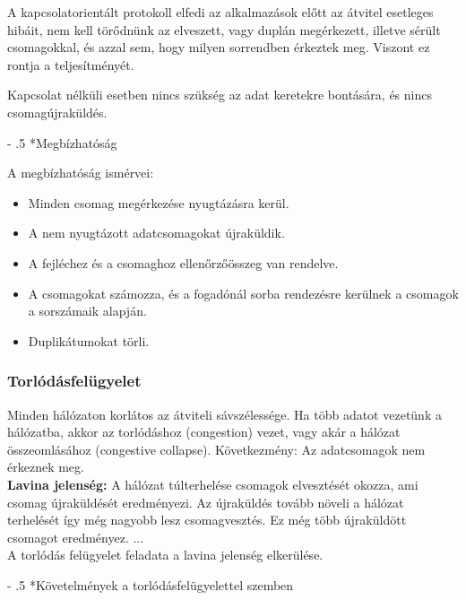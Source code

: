 \documentclass[12pt]{article}
\makeatletter
\renewcommand\paragraph{%
	\@startsection{paragraph}{4}{0mm}%
	{-\baselineskip}%
	{.5\baselineskip}%
	{\normalfont\normalsize\bfseries}}
\makeatother
\begin{document}
    \noindent A kapcsolatorientált protokoll elfedi az alkalmazások előtt az átvitel esetleges hibáit, nem kell törődnünk az elveszett, vagy duplán megérkezett, illetve sérült csomagokkal, és azzal sem, hogy milyen sorrendben érkeztek meg. Viszont ez rontja a teljesítményét.

	\noindent Kapcsolat nélküli esetben nincs szükség az adat keretekre bontására, és nincs  csomagújraküldés.

	\paragraph*{Megbízhatóság}

	A megbízhatóság ismérvei:
	\begin{itemize}
        	\item Minden csomag megérkezése nyugtázásra kerül.
        	\item A nem nyugtázott adatcsomagokat újraküldik.
        	\item A fejléchez és a csomaghoz ellenőrzőösszeg van rendelve.
        	\item A csomagokat számozza, és a fogadónál sorba rendezésre kerülnek a csomagok a sorszámaik alapján.
        	\item Duplikátumokat törli.
	\end{itemize}

	\subsubsection*{Torlódásfelügyelet}

	Minden hálózaton  korlátos az átviteli sávszélessége. Ha több adatot vezetünk a hálózatba, akkor az torlódáshoz (congestion) vezet, vagy akár a hálózat összeomlásához (congestive collapse). Következmény: Az adatcsomagok nem érkeznek meg.\\

	\noindent \textbf{Lavina jelenség:} A hálózat túlterhelése csomagok elvesztését okozza, ami csomag újraküldését eredményezi. Az újraküldés tovább növeli a hálózat terhelését így még nagyobb lesz csomagvesztés. Ez még több újraküldött csomagot eredményez. ... \\
	A torlódás felügyelet feladata a lavina jelenség elkerülése.

	\paragraph*{Követelmények a torlódásfelügyelettel szemben}
\end{document}
